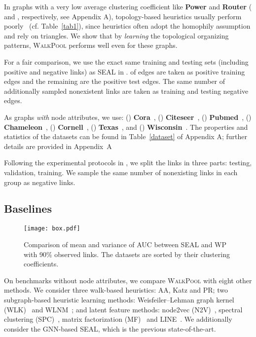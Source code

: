 \documentclass[11pt]{article}
\newcommand{\walkpool}{\textsc{WalkPool}\xspace}
\newcommand{\UPDATE}[1]{\textcolor{WowColor}{{#1}}}
\renewcommand{\UPDATE}[1]{#1}
\begin{document}
In graphs with a very low average clustering coefficient like \textbf{Power} and \textbf{Router} ( and , respectively, see Appendix A), topology-based heuristics usually perform poorly~\citep{lu2011link} (cf. Table~\ref{tab1}), since heuristics often adopt the homophily assumption and rely on triangles. We show that by \textit{learning} the topological organizing patterns, \walkpool performs well even for these graphs. 

For a fair comparison, we use the exact same training and testing sets (including positive and negative links) as SEAL in \cite{zhang2018link}.  of edges are taken as positive training edges and the remaining  are the positive test edges. The same number of additionally sampled nonexistent links are taken as training and testing negative edges.

\UPDATE{As graphs \textit{with} node attributes, we use: (\romannumeral1) \textbf{Cora}~\citep{mccallum2000automating}, (\romannumeral2) \textbf{Citeseer}~\citep{giles1998citeseer}, (\romannumeral3) \textbf{Pubmed}~\citep{namata2012query}, (\romannumeral4) \textbf{Chameleon}~\citep{rozemberczki2021multi}, (\romannumeral5) \textbf{Cornell}~\citep{craven1998learning}, (\romannumeral6) \textbf{Texas}~\citep{craven1998learning}, and (\romannumeral7) \textbf{Wisconsin}~\citep{craven1998learning}. The properties and statistics of the datasets can be found in Table~\ref{dataset} of Appendix A; further details are provided in Appendix~A}

Following the experimental protocols in \citep{kipf2016variational,pan2018adversarially,mavromatis2020graph}, we split the links in three parts:  testing,  validation,  training. We sample the same number of nonexisting links in each group as negative links.
\vspace{-4mm}
\subsection{Baselines}
\vspace{-4mm}
\begin{wrapfigure}{r}{0.5\textwidth} 
    \centering
    \vspace{-6mm}
    \texttt{[image: box.pdf]}
    \caption{ Comparison of  mean and variance of AUC between SEAL and WP with 90\% observed links.  The datasets are sorted by their clustering coefficients.}
    \label{fig:clustcoeffbox}
    \vspace{-4mm}
\end{wrapfigure}
On benchmarks without node attributes, we compare \walkpool with eight other methods.  We consider three walk-based heuristics: AA, Katz and PR; two subgraph-based heuristic learning methods: Weisfeiler--Lehman graph kernel (WLK)~\citep{shervashidze2011weisfeiler} and WLNM~\citep{zhang2017weisfeiler}; and latent feature methods: node2vec (N2V)~\citep{grover2016node2vec}, spectral clustering (SPC)~\citep{tang2011leveraging}, \UPDATE {matrix factorization (MF)~\citep{koren2009matrix} and LINE~\citep{tang2015line}}. We additionally consider the GNN-based SEAL, which is the previous state-of-the-art. 
\end{document}
